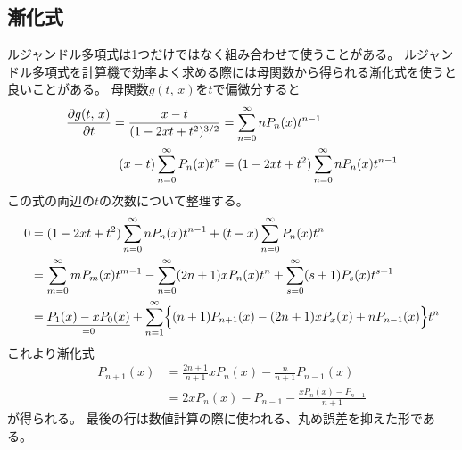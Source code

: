 \documentclass[../master.tex]{subfiles}
\begin{document}
\subsection{漸化式}
ルジャンドル多項式は1つだけではなく組み合わせて使うことがある。
ルジャンドル多項式を計算機で効率よく求める際には母関数から得られる漸化式を使うと良いことがある。
母関数\(g(t,\,x)\)を\(t\)で偏微分すると
\begin{align}
	\pdv{g(t,\,x)}{t} = \frac{x-t}{(1-2xt+t^2)^{3/2}} & = \sum_{n=0}^{\infty} nP_n(x)t^{n-1}            \\
	(x-t)\sum_{n=0}^{\infty} P_n(x) t^n               & = (1-2xt+t^2)\sum_{n=0}^{\infty} nP_n(x)t^{n-1}
\end{align}
この式の両辺の\(t\)の次数について整理する。
\begin{equation}\begin{aligned}[b]
    0 & = (1-2xt+t^2)\sum_{n=0}^{\infty} nP_n(x)t^{n-1} +(t-x)\sum_{n=0}^{\infty} P_n(x) t^n \\
	  & = \sum_{m=0}^{\infty} mP_m(x)t^{m-1}
	- \sum_{n=0}^{\infty}(2n+1)xP_n(x)t^n
	+ \sum_{s=0}^{\infty} (s+1)P_s(x)t^{s+1}                                                 \\
	  & = \underset{=0}{\underline{P_1(x) -xP_0(x)}}+
	\sum_{n=1}^{\infty} \Bigl\{
	(n+1)P_{n+1}(x) - (2n+1)xP_x(x) + nP_{n-1}(x)
	\Bigr\}t^n
\end{aligned}\end{equation}
これより漸化式
\begin{align}
	P_{n+1}(x) & = \frac{2n+1}{n+1}xP_n(x)-\frac{n}{n+1}P_{n-1}(x) \label{eq:legendre_recurrece1} \\
	           & = 2xP_n(x)-P_{n-1} -\frac{xP_n(x)-P_{n-1}}{n+1}
\end{align}
が得られる。
最後の行は数値計算の際に使われる、丸め誤差を抑えた形である。
\end{document}
